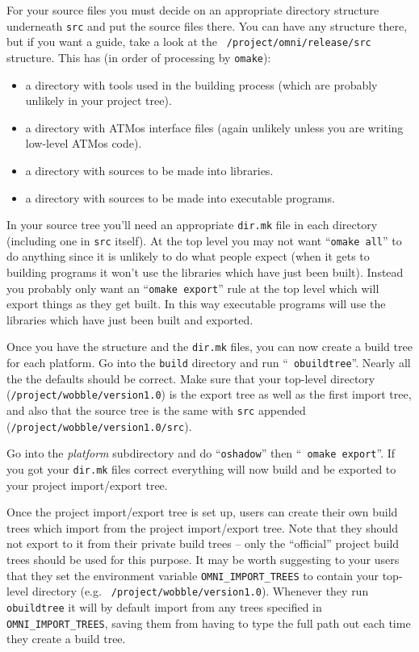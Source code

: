 \documentclass[11pt,twoside,onecolumn]{article}
\begin{document}
For your source files you must decide on an appropriate directory structure
underneath {\tt src} and put the source files there.  You can have any
structure there, but if you want a guide, take a look at the {\tt
/project/omni/release/src} structure.  This has (in order of processing by
{\tt omake}):
\begin{itemize}
\item a directory with tools used in the building process (which are probably
unlikely in your project tree).
\item a directory with ATMos interface files (again unlikely unless you are
writing low-level ATMos code).
\item a directory with sources to be made into libraries.
\item a directory with sources to be made into executable programs.
\end{itemize}
In your source tree you'll need an appropriate {\tt dir.mk} file in each
directory (including one in {\tt src} itself).  At the top level you may not
want ``{\tt omake all}'' to do anything since it is unlikely to do what people
expect (when it gets to building programs it won't use the libraries which have
just been built).  Instead you probably only want an ``{\tt omake export}''
rule at the top level which will export things as they get built.  In this way
executable programs will use the libraries which have just been built and
exported.

Once you have the structure and the {\tt dir.mk} files, you can now create a
build tree for each platform.  Go into the {\tt build} directory and run ``{\tt
obuildtree}''.  Nearly all the the defaults should be correct.  Make sure that
your top-level directory ({\tt /project/wobble/version1.0}) is the export tree
as well as the first import tree, and also that the source tree is the same
with {\tt src} appended ({\tt /project/wobble/version1.0/src}).

Go into the {\it platform} subdirectory and do ``{\tt oshadow}'' then ``{\tt
omake export}''.  If you got your {\tt dir.mk} files correct everything will
now build and be exported to your project import/export tree.

Once the project import/export tree is set up, users can create their own build
trees which import from the project import/export tree.  Note that they should
not export to it from their private build trees -- only the ``official''
project build trees should be used for this purpose.  It may be worth
suggesting to your users that they set the environment variable
\verb|OMNI_IMPORT_TREES| to contain your top-level directory (e.g. {\tt
/project/wobble/version1.0}).  Whenever they run {\tt obuildtree} it will by
default import from any trees specified in \verb|OMNI_IMPORT_TREES|, saving
them from having to type the full path out each time they create a build tree.
\end{document}
